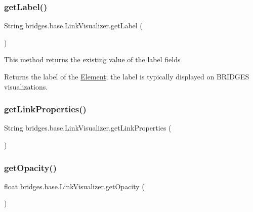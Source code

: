 \subsubsection{\texorpdfstring{get\+Label()}{getLabel()}}
{\footnotesize\ttfamily String bridges.\+base.\+Link\+Visualizer.\+get\+Label (\begin{DoxyParamCaption}{ }\end{DoxyParamCaption})}

This method returns the existing value of the label fields

\begin{DoxyReturn}{Returns}
the label of the \mbox{\hyperlink{classbridges_1_1base_1_1_element}{Element}}; the label is typically displayed on B\+R\+I\+D\+G\+ES visualizations. 
\end{DoxyReturn}
\mbox{\label{classbridges_1_1base_1_1_link_visualizer_ab64d9b7e2b99f7ebce80cbabfe4adf2a}} 
\subsubsection{\texorpdfstring{get\+Link\+Properties()}{getLinkProperties()}}
{\footnotesize\ttfamily String bridges.\+base.\+Link\+Visualizer.\+get\+Link\+Properties (\begin{DoxyParamCaption}{ }\end{DoxyParamCaption})}

\mbox{\label{classbridges_1_1base_1_1_link_visualizer_a07cdd435a54e4b612ad63614f2a27a4a}} 
\subsubsection{\texorpdfstring{get\+Opacity()}{getOpacity()}}
{\footnotesize\ttfamily float bridges.\+base.\+Link\+Visualizer.\+get\+Opacity (\begin{DoxyParamCaption}{ }\end{DoxyParamCaption})}

